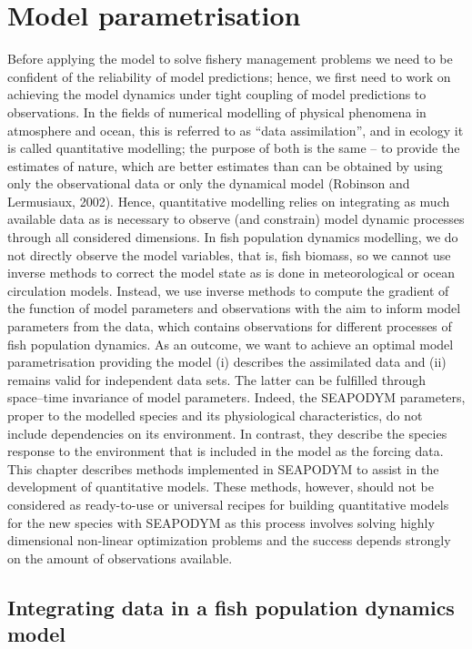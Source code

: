 \chapter{Model parametrisation}\label{ch:parametrisation}

Before applying the model to solve fishery management problems we need to be confident of the reliability of model predictions; hence, we first need to work on achieving the model dynamics under tight coupling of model predictions to observations. In the fields of numerical modelling of physical phenomena in atmosphere and ocean, this is referred to as ``data assimilation'', and in ecology it is called quantitative modelling; the purpose of both is the same -- to provide the estimates of nature, which are better estimates than can be obtained by using only the observational data or only the dynamical model (Robinson and Lermusiaux, 2002). Hence, quantitative modelling relies on integrating as much available data as is necessary to observe (and constrain) model dynamic processes through all considered dimensions. In fish population dynamics modelling, we do not directly observe the model variables, that is, fish biomass, so we cannot use inverse methods to correct the model state as is done in meteorological or ocean circulation models. Instead, we use inverse methods to compute the gradient of the function of model parameters and observations with the aim to inform model parameters from the data, which contains observations for different processes of fish population dynamics. As an outcome, we want to achieve an optimal model parametrisation providing the model (i) describes the assimilated data and (ii) remains valid for independent data sets. The latter can be fulfilled through space--time invariance of model parameters. Indeed, the SEAPODYM parameters, proper to the modelled species and its physiological characteristics, do not include dependencies on its environment. In contrast, they describe the species response to the environment that is included in the model as the forcing data. This chapter describes methods implemented in SEAPODYM to assist in the development of quantitative models. These methods, however, should not be considered as ready-to-use or universal recipes for building quantitative models for the new species with SEAPODYM as this process involves solving highly dimensional non-linear optimization problems and the success depends strongly on the amount of observations available. 

\section{Integrating data in a fish population dynamics model}\label{sec:integrating-data}

